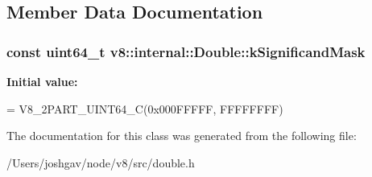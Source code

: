 \subsection{Member Data Documentation}
\subsubsection[{\texorpdfstring{k\+Significand\+Mask}{kSignificandMask}}]{\setlength{\rightskip}{0pt plus 5cm}const uint64\+\_\+t v8\+::internal\+::\+Double\+::k\+Significand\+Mask\hspace{0.3cm}{\ttfamily [static]}}\hypertarget{classv8_1_1internal_1_1_double_a556ce351853d566d0f8a266981c00447}{}\label{classv8_1_1internal_1_1_double_a556ce351853d566d0f8a266981c00447}
{\bfseries Initial value\+:}
\begin{DoxyCode}
=
      V8\_2PART\_UINT64\_C(0x000FFFFF, FFFFFFFF)
\end{DoxyCode}


The documentation for this class was generated from the following file\+:\begin{DoxyCompactItemize}
\item 
/\+Users/joshgav/node/v8/src/double.\+h\end{DoxyCompactItemize}
